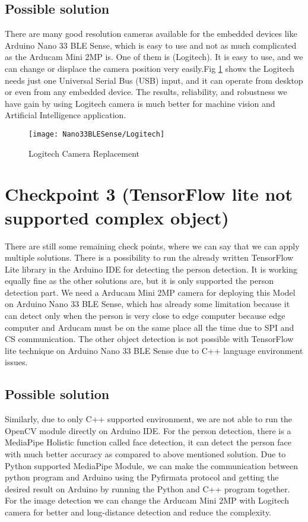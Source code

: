 \subsection{Possible solution}
There are many good resolution cameras available for the embedded devices like Arduino Nano 33 BLE Sense, which is easy to use and not as much complicated as the Arducam Mini 2MP is. One of them is (Logitech). It is easy to use, and we can change or displace the camera position very easily.Fig \ref{Logitech Camera} shows the Logitech needs just one Universal Serial Bus (USB) input, and it can operate from desktop or even from any embedded device. The results, reliability, and robustness we have gain by using Logitech camera is much better for machine vision and Artificial Intelligence application. 
\begin{figure}[h]
	\centering
	\texttt{[image: Nano33BLESense/Logitech]}
	\caption{Logitech Camera Replacement}
	\label{Logitech Camera}
\end{figure}
\section{Checkpoint 3 (TensorFlow lite not supported complex object)}
There are still some remaining check points, where we can say that we can apply multiple solutions. There is a possibility to run the already written TensorFlow Lite library in the Arduino IDE for detecting the person detection. It is working equally fine as the other solutions are, but it is only supported the person detection part. We need a Arducam Mini 2MP camera for deploying this Model on Arduino Nano 33 BLE Sense, which has already some limitation because it can detect only when the person is very close to edge computer because edge computer and Arducam must be on the same place all the time due to SPI and CS communication. The other object detection is not possible with TensorFlow lite technique on Arduino Nano 33 BLE Sense due to C++ language environment issues.
\subsection{Possible solution}
Similarly, due to only C++ supported environment, we are not able to run the OpenCV module directly on Arduino IDE. For the person detection, there is a MediaPipe Holistic function called face detection, it can detect the person face with much better accuracy as compared to above mentioned solution. Due to Python supported MediaPipe Module, we can make the communication between python program and Arduino using the Pyfirmata protocol and getting the desired result on Arduino by running the Python and C++ program together. For the image detection we can change the Arducam Mini 2MP with Logitech camera for better and long-distance detection and reduce the complexity. 
